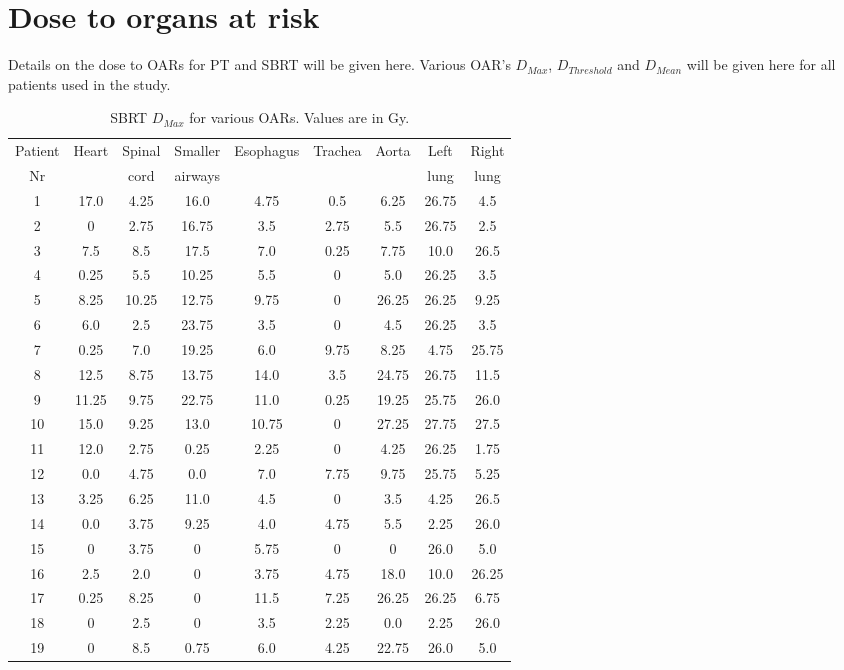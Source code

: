 \newpage
\section{Dose to organs at risk}

Details on the dose to OARs for PT and SBRT will be given here. Various OAR's $D_{Max}$, $D_{Threshold}$ and $D_{Mean}$ will be given here for all patients used in the study.

\begin{table}[H]
  \centering
  \caption{SBRT $D_{Max}$ for various OARs. Values are in Gy.}
  \begin{tabular}{|c|c|c|c|c|c|c|c|c|} \hline
   Patient & \multirow{2}{*}{Heart} & Spinal  & Smaller  & \multirow{2}{*}{Esophagus} & \multirow{2}{*}{Trachea} & \multirow{2}{*}{Aorta} & Left  & Right \\
   Nr & & cord & airways & & & & lung & lung \\
 \hline\hline 
1 & 17.0 & 4.25 & 16.0 & 4.75 & 0.5 & 6.25 & 26.75 & 4.5\\
2 & 0 & 2.75 & 16.75 & 3.5 & 2.75 & 5.5 & 26.75 & 2.5\\
3 & 7.5 & 8.5 & 17.5 & 7.0 & 0.25 & 7.75 & 10.0 & 26.5\\
4 & 0.25 & 5.5 & 10.25 & 5.5 & 0 & 5.0 & 26.25 & 3.5\\
5 & 8.25 & 10.25 & 12.75 & 9.75 & 0 & 26.25 & 26.25 & 9.25\\
6 & 6.0 & 2.5 & 23.75 & 3.5 & 0 & 4.5 & 26.25 & 3.5\\
7 & 0.25 & 7.0 & 19.25 & 6.0 & 9.75 & 8.25 & 4.75 & 25.75\\
8 & 12.5 & 8.75 & 13.75 & 14.0 & 3.5 & 24.75 & 26.75 & 11.5\\
9 & 11.25 & 9.75 & 22.75 & 11.0 & 0.25 & 19.25 & 25.75 & 26.0\\
10 & 15.0 & 9.25 & 13.0 & 10.75 & 0 & 27.25 & 27.75 & 27.5\\
11 & 12.0 & 2.75 & 0.25 & 2.25 & 0 & 4.25 & 26.25 & 1.75\\
12 & 0.0 & 4.75 & 0.0 & 7.0 & 7.75 & 9.75 & 25.75 & 5.25\\
13 & 3.25 & 6.25 & 11.0 & 4.5 & 0 & 3.5 & 4.25 & 26.5\\
14 & 0.0 & 3.75 & 9.25 & 4.0 & 4.75 & 5.5 & 2.25 & 26.0\\
15 & 0 & 3.75 & 0 & 5.75 & 0 & 0 & 26.0 & 5.0\\
16 & 2.5 & 2.0 & 0 & 3.75 & 4.75 & 18.0 & 10.0 & 26.25\\
17 & 0.25 & 8.25 & 0 & 11.5 & 7.25 & 26.25 & 26.25 & 6.75\\
18 & 0 & 2.5 & 0 & 3.5 & 2.25 & 0.0 & 2.25 & 26.0\\
19 & 0 & 8.5 & 0.75 & 6.0 & 4.25 & 22.75 & 26.0 & 5.0\\
\hline\hline
  \end{tabular}
  \label{tab:oarlimits2}
\end{table}
